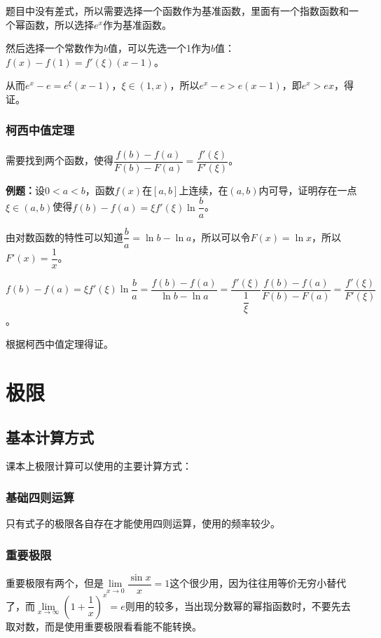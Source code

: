 \documentclass[UTF8, 12pt]{ctexart}
\begin{document}
题目中没有差式，所以需要选择一个函数作为基准函数，里面有一个指数函数和一个幂函数，所以选择$e^x$作为基准函数。

然后选择一个常数作为$b$值，可以先选一个1作为$b$值：$f(x)-f(1)=f'(\xi)(x-1)$。

从而$e^x-e=e^\xi(x-1)$，$\xi\in(1,x)$，所以$e^x-e>e(x-1)$，即$e^x>ex$，得证。

\subsubsection{柯西中值定理}

需要找到两个函数，使得$\dfrac{f(b)-f(a)}{F(b)-F(a)}=\dfrac{f'(\xi)}{F'(\xi)}$。

\textbf{例题：}设$0<a<b$，函数$f(x)$在$[a,b]$上连续，在$(a,b)$内可导，证明存在一点$\xi\in(a,b)$使得$f(b)-f(a)=\xi f'(\xi)\ln\dfrac{b}{a}$。

由对数函数的特性可以知道$\dfrac{b}{a}=\ln b-\ln a$，所以可以令$F(x)=\ln x$，所以$F'(x)=\dfrac{1}{x}$。

$f(b)-f(a)=\xi f'(\xi)\ln\dfrac{b}{a}=\dfrac{f(b)-f(a)}{\ln b-\ln a}=\dfrac{f'(\xi)}{\dfrac{1}{\xi}}\dfrac{f(b)-f(a)}{F(b)-F(a)}=\dfrac{f'(\xi)}{F'(\xi)}$。

根据柯西中值定理得证。

\section{极限}

\subsection{基本计算方式}

课本上极限计算可以使用的主要计算方式：

\subsubsection{基础四则运算}

只有式子的极限各自存在才能使用四则运算，使用的频率较少。

\subsubsection{重要极限}

重要极限有两个，但是$\lim\limits_{x\to 0}\dfrac{\sin x}{x}=1$这个很少用，因为往往用等价无穷小替代了，而$\lim\limits_{x\to\infty}\left(1+\dfrac{1}{x}\right)^x=e$则用的较多，当出现分数幂的幂指函数时，不要先去取对数，而是使用重要极限看看能不能转换。\medskip
\end{document}
